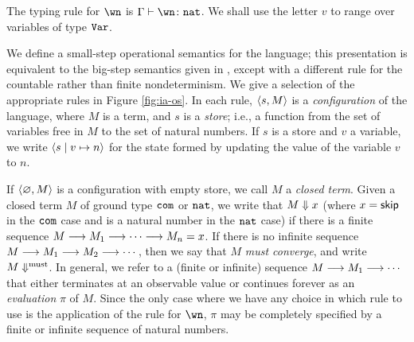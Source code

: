 \documentclass[sigplan,10pt,review]{acmart}\settopmatter{printfolios=true,printccs=false,printacmref=false}
\begin{document}
The typing rule for $\wn$ is $\Gamma \vdash \wn\from\nat$.
We shall use the letter $v$ to range over variables of type ${\mathtt{Var}}$.  

We define a small-step operational semantics for the language; this presentation is equivalent to the big-step semantics given in \cite{mcCHFiniteND}, except with a different rule for the countable rather than finite nondeterminism.
We give a selection of the appropriate rules in Figure \ref{fig:ia-os}.
In each rule, $\langle s , M \rangle$ is a \emph{configuration} of the language, where $M$ is a term, and $s$ is a \emph{store}; i.e., a function from the set of variables free in $M$ to the set of natural numbers.  
If $s$ is a store and $v$ a variable, we write $\langle s \mid v \mapsto n \rangle$ for the state formed by updating the value of the variable $v$ to $n$.

\begin{figure*}
  \caption{Selected rules in the small-step operational semantics of Idealized Algol with countable nondeterminism}
  \label{fig:ia-os}
\end{figure*}

If $\langle \varnothing , M \rangle$ is a configuration with empty store, we call $M$ a \emph{closed term}.  
Given a closed term $M$ of ground type ${\mathtt{com}}$ or ${\mathtt{nat}}$, we write that $M\Downarrow x$ (where $x={\mathsf{skip}}$ in the ${\mathtt{com}}$ case and is a natural number in the ${\mathtt{nat}}$ case) if there is a finite sequence $M \longrightarrow M_1 \longrightarrow \cdots \longrightarrow M_n = x$.
If there is no infinite sequence $M \longrightarrow M_1 \longrightarrow M_2 \longrightarrow \cdots$, then we say that $M$ \emph{must converge}, and write $M\Downarrow^{\text{must}}$.
In general, we refer to a (finite or infinite) sequence $M \longrightarrow M_1 \longrightarrow \cdots$ that either terminates at an observable value or continues forever as an \emph{evaluation} $\pi$ of $M$.  
Since the only case where we have any choice in which rule to use is the application of the rule for $\wn$, $\pi$ may be completely specified by a finite or infinite sequence of natural numbers.
\end{document}
